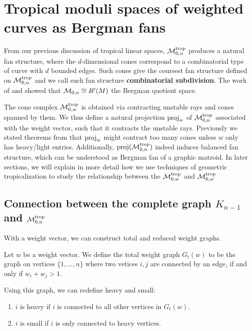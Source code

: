 \section{Tropical moduli spaces of weighted curves as Bergman fans}
\label{sec:tropical-moduli-spaces-of-weighted-curves-as-bergman-fans}
    From our previous discussion of tropical linear spaces,
    $\mathcal{M}_{0, n}^{\operatorname{trop}}$ produces a natural fan structure, 
    where the $d$-dimensional cones 
    correspond to a combinatorial type of curve
    with $d$ bounded edges.
    Such cones give the coursest fan structure defined on $\mathcal{M}_{0, n}^{\operatorname{trop}}$
    and we call such fan structure \textbf{combinatorial subdivision}.
    The work of \citet{Ardila2006} and \citet{Francois2013}
    showed that $\mathcal{M}_{0, n} \cong B'(M)$ 
    the Bergman quotient space. 
    
    The cone complex $\mathcal{M}_{0, w}^{\operatorname{trop}}$ is obtained via contracting unstable rays and cones spanned by them. 
    We thus define a natural projection $\operatorname{proj}_w$ of $\mathcal{M}_{0, n}^{\operatorname{trop}}$ associated with the weight vector, such that it contracts the unstable rays.
    Previously we stated theorems from \citet{Cavalieri2014} that $\operatorname{proj}_w$ might contract too many cones unless $w$ only has heavy/light entries. 
    Additionally, $\operatorname{proj}(\mathcal{M}_{0, n}^{\operatorname{trop}})$ indeed induces balanced fan structure, which can be understood as Bergman fan of a graphic matroid. 
    In later sections, we will explain in more detail how we use techniques of geometric tropicalization to study the relationship between the $\mathcal{M}_{0, w}^{\operatorname{trop}}$ and $\mathcal{M}_{0, w}^{\operatorname{trop}}$
    
    \subsection{Connection between the complete graph $K_{n-1}$ and $\mathcal{M}_{0, n}^{\operatorname{trop}}$}
    \label{subsec:complete-graph-m-0n}
        With a weight vector, we can construct total and reduced weight graphs.
        
        \begin{definition}
        \label{def:total-weight-graph}
            Let $w$ be a weight vector. 
            We define the total weight graph $G_t(w)$ to be the graph on 
            vertices $\{1, \ldots, n\}$ where two vetices $i, j$ are connected by an edge, if and only if $w_i + w_j > 1$. 
        
            Using this graph, we can redefine heavy and small:
            
            \begin{enumerate}
            \item $i$ is heavy if $i$ is connected to all other vertices in $G_t(w)$.
            
            \item $i$ is small if $i$ is only connected to heavy vertices.
            \end{enumerate}
        \end{definition}
    
